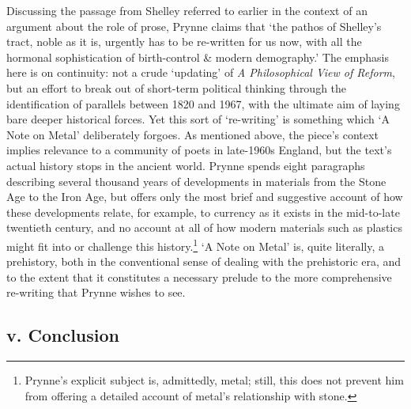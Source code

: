 \documentclass[]{article}
\begin{document}
Discussing the passage from Shelley referred to earlier in the context
of an argument about the role of prose, Prynne claims that ‘the pathos
of Shelley’s tract, noble as it is, urgently has to be re-written for us
now, with all the hormonal sophistication of birth-control \& modern
demography.’ The emphasis here is on continuity: not a crude ‘updating’
of \emph{A Philosophical View of Reform}, but an effort to break out of
short-term political thinking through the identification of parallels
between 1820 and 1967, with the ultimate aim of laying bare deeper
historical forces. Yet this sort of ‘re-writing’ is something which ‘A
Note on Metal’ deliberately forgoes. As mentioned above, the piece’s
context implies relevance to a community of poets in late-1960s England,
but the text’s actual history stops in the ancient world. Prynne spends
eight paragraphs describing several thousand years of developments in
materials from the Stone Age to the Iron Age, but offers only the most
brief and suggestive account of how these developments relate, for
example, to currency as it exists in the mid-to-late twentieth century,
and no account at all of how modern materials such as plastics might fit
into or challenge this history.\footnote{Prynne’s explicit subject is,
  admittedly, metal; still, this does not prevent him from offering a
  detailed account of metal’s relationship with stone.} ‘A Note on
Metal’ is, quite literally, a prehistory, both in the conventional sense
of dealing with the prehistoric era, and to the extent that it
constitutes a necessary prelude to the more comprehensive re-writing
that Prynne wishes to see.

\subsection{v. Conclusion}\label{v.-conclusion-1}
\end{document}
